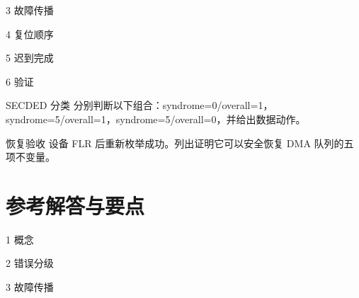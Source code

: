 \begin{chapterexercise}{3}
故障传播
\end{chapterexercise}

\begin{chapterexercise}{4}
复位顺序
\end{chapterexercise}

\begin{chapterexercise}{5}
迟到完成
\end{chapterexercise}

\begin{chapterexercise}{6}
验证
\end{chapterexercise}

\begin{chapterexercise}{SECDED 分类}
分别判断以下组合：syndrome=0/overall=1，syndrome=5/overall=1，syndrome=5/overall=0，并给出数据动作。
\end{chapterexercise}

\begin{chapterexercise}{恢复验收}
设备 FLR 后重新枚举成功。列出证明它可以安全恢复 DMA 队列的五项不变量。
\end{chapterexercise}

\section*{参考解答与要点}

\begin{chapteranswer}{1}
概念
\end{chapteranswer}

\begin{chapteranswer}{2}
错误分级
\end{chapteranswer}

\begin{chapteranswer}{3}
故障传播
\end{chapteranswer}

